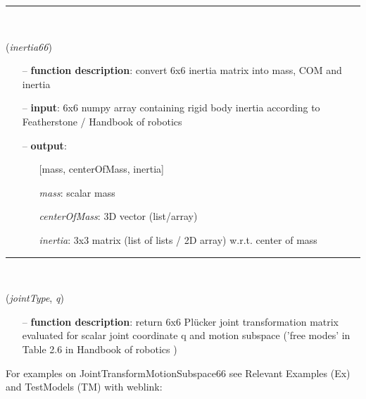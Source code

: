 \begin{itemize}[leftmargin=1.4cm]
\begin{itemize}[leftmargin=1.4cm]
\begin{itemize}[leftmargin=0.5cm]
\begin{itemize}[leftmargin=1.4cm]
\begin{itemize}[leftmargin=1.4cm]
\begin{itemize}[leftmargin=0.5cm]
\begin{itemize}[leftmargin=1.4cm]
\begin{itemize}[leftmargin=0.5cm]
\begin{itemize}[leftmargin=1.4cm]
\begin{itemize}[leftmargin=1.4cm]
\begin{itemize}[leftmargin=1.4cm]
%
\noindent\rule{8cm}{0.75pt}\vspace{1pt} \\ 
\begin{flushleft}
\label{sec:kinematicTree:Inertia66toMassCOMinertia}
({\it inertia66})
\end{flushleft}
\setlength{\itemindent}{0.7cm}
\begin{itemize}[leftmargin=0.7cm]
\item[--]
{\bf function description}: convert 6x6 inertia matrix into mass, COM and inertia
\item[--]
{\bf input}: 6x6 numpy array containing rigid body inertia according to Featherstone / Handbook of robotics \cite{Siciliano2016}
\item[--]
{\bf output}: \vspace{-6pt}
\begin{itemize}[leftmargin=1.2cm]
\setlength{\itemindent}{-0.7cm}
\item[][mass, centerOfMass, inertia]
\item[]{\it mass}: scalar mass
\item[]{\it centerOfMass}: 3D vector (list/array)
\item[]{\it inertia}: 3x3 matrix (list of lists / 2D array) w.r.t. center of mass
\end{itemize}
\vspace{12pt}\end{itemize}
%
\noindent\rule{8cm}{0.75pt}\vspace{1pt} \\ 
\begin{flushleft}
\label{sec:kinematicTree:JointTransformMotionSubspace66}
({\it jointType}, {\it q})
\end{flushleft}
\setlength{\itemindent}{0.7cm}
\begin{itemize}[leftmargin=0.7cm]
\item[--]
{\bf function description}: return 6x6 Pl\"ucker joint transformation matrix evaluated for scalar joint coordinate q and motion subspace ('free modes' in Table 2.6 in Handbook of robotics \cite{Siciliano2016})
\vspace{12pt}\end{itemize}
%
%
\noindent For examples on JointTransformMotionSubspace66 see Relevant Examples (Ex) and TestModels (TM) with weblink:

\end{itemize}
\end{itemize}
\end{itemize}
\end{itemize}
\end{itemize}
\end{itemize}
\end{itemize}
\end{itemize}
\end{itemize}
\end{itemize}
\end{itemize}
